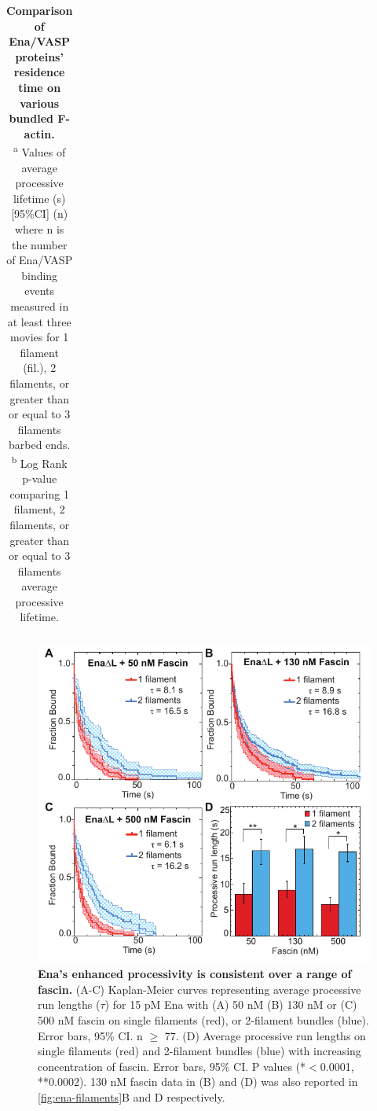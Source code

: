 \begin{table}[hbtp]
\begin{tabulary}{.9\textwidth}{C C C C C C C C}
\bottomrule
\end{tabulary}
\caption[Comparison of Ena/VASP proteins' residence time on various bundled F-actin.]{\textbf{Comparison of Ena/VASP proteins' residence time on various bundled F-actin.} \\
   \textsuperscript{a} Values of average processive lifetime (s) [95\%CI] (n) where n is the number of Ena/VASP binding events measured in at least three movies for 1 filament (fil.), 2 filaments, or greater than or equal to 3 filaments barbed ends.\\
   \textsuperscript{b} Log Rank p-value comparing 1 filament, 2 filaments, or greater than or equal to 3 filaments average processive lifetime.}
\label{tab:ena-processive-filaments}
\end{table}

\begin{figure}
\centering
\includegraphics[width=13cm]{img/ch02/Supp_Figure_1_mboc2.pdf}
\caption[Ena's enhanced processivity is consistent over a range of fascin.]{\textbf{Ena's enhanced processivity is consistent over a range of fascin.} (A-C) Kaplan-Meier curves representing average processive run lengths ($\tau$) for 15 pM Ena with (A) 50 nM (B) 130 nM or (C) 500 nM fascin on single filaments (red), or 2-filament bundles (blue). Error bars, 95\% CI. n $\geq$ 77. (D) Average processive run lengths on single filaments (red) and 2-filament bundles (blue) with increasing concentration of fascin. Error bars, 95\% CI. P values (*$<$0.0001, **0.0002). 130 nM fascin data in (B) and (D) was also reported in \ref{fig:ena-filaments}B and D respectively.}
\label{fig:fascin-range}
\end{figure}

